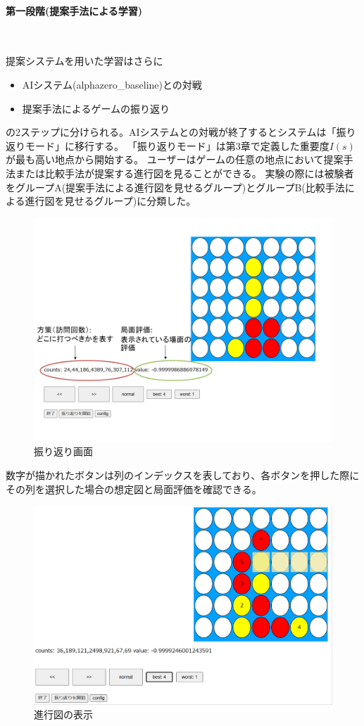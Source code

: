 \paragraph{第一段階(提案手法による学習)}~
\par 提案システムを用いた学習はさらに
\begin{itemize}
	\item AIシステム(alphazero\_baseline)との対戦
	\item 提案手法によるゲームの振り返り
\end{itemize}
の2ステップに分けられる。AIシステムとの対戦が終了するとシステムは「振り返りモード」に移行する。
「振り返りモード」は第3章で定義した重要度$I(s)$が最も高い地点から開始する。
ユーザーはゲームの任意の地点において提案手法または比較手法が提案する進行図を見ることができる。
実験の際には被験者をグループA(提案手法による進行図を見せるグループ)とグループB(比較手法による進行図を見せるグループ)に分類した。
\begin{figure}[t]
	\centering
	\includegraphics[width=\linewidth]{./figure/lookBack.png}
	\caption{振り返り画面}
	\label{fig:lookBack}
\end{figure}
数字が描かれたボタンは列のインデックスを表しており、各ボタンを押した際にその列を選択した場合の想定図と局面評価を確認できる。
\begin{figure}[t]
    \centering
    \includegraphics[width=\linewidth]{./figure/trajSystem.pdf}
	\caption{進行図の表示}
	\label{fig:trajSystem}
\end{figure}
